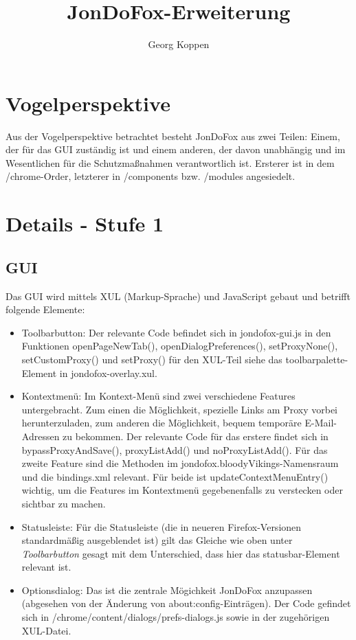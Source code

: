 \documentclass[a4paper,10pt]{scrartcl}
\title{JonDoFox-Erweiterung}
\author{Georg Koppen}
\begin{document}
  \maketitle
  \section{Vogelperspektive}
  Aus der Vogelperspektive betrachtet besteht JonDoFox aus zwei Teilen: Einem,
  der für das GUI zuständig ist und einem anderen, der davon unabhängig und im
  Wesentlichen für die Schutzmaßnahmen verantwortlich ist.
  Ersterer ist in dem /chrome-Order, letzterer in /components bzw. /modules
  angesiedelt.
  \section{Details - Stufe 1}
    \subsection{GUI}
      Das GUI wird mittels XUL (Markup-Sprache) und JavaScript gebaut und
      betrifft folgende Elemente:
      \begin{itemize}
        \item Toolbarbutton: Der relevante Code befindet sich in jondofox-gui.js
          in den Funktionen openPageNewTab(), openDialogPreferences(),
          setProxyNone(), setCustomProxy() und setProxy() für den XUL-Teil siehe
          das toolbarpalette-Element in jondofox-overlay.xul.
        \item Kontextmenü: Im Kontext-Menü sind zwei verschiedene Features
          untergebracht. Zum einen die Möglichkeit, spezielle Links am Proxy
          vorbei herunterzuladen, zum anderen die Möglichkeit, bequem temporäre
          E-Mail-Adressen zu bekommen. Der relevante Code für das erstere findet
          sich in bypassProxyAndSave(), proxyListAdd() und
          noProxyListAdd(). Für das zweite Feature sind die Methoden im
          jondofox.bloodyVikings-Namensraum und die bindings.xml relevant. Für
          beide ist updateContextMenuEntry() wichtig, um die Features im
          Kontextmenü gegebenenfalls zu verstecken oder sichtbar zu machen.
        \item Statusleiste: Für die Statusleiste (die in neueren
          Firefox-Versionen standardmäßig ausgeblendet ist) gilt das Gleiche wie
          oben unter \textit{Toolbarbutton} gesagt mit dem Unterschied, dass
          hier das statusbar-Element relevant ist.
        \item Optionsdialog: Das ist die zentrale Mögichkeit JonDoFox anzupassen
          (abgesehen von der Änderung von about:config-Einträgen). Der Code
          gefindet sich in /chrome/content/dialogs/prefs-dialogs.js sowie in der
          zugehörigen XUL-Datei.
      \end{itemize}
\end{document}
